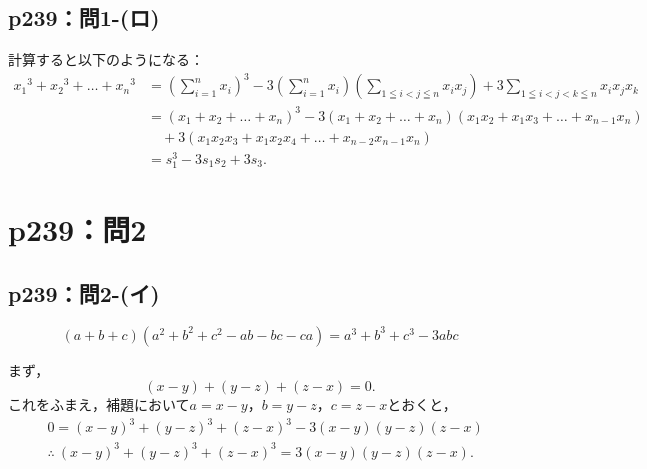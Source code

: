 \documentclass[a4paper,10pt,fleqn]{ltjsarticle}
\begin{document}
\subsection*{p239：問1-(ロ)}
\begin{tleftbar}
  計算すると以下のようになる：
  \begin{align*}
    {x_1}^3 + {x_2}^3+\dots+{x_n}^3 & = \left (\sum_{i=1}^{n} x_i \right )^3 - 3\left (\sum_{i=1}^{n} x_i \right ) \left(\sum_{1 \leqq i <j \leqq n} x_i x_j \right) + 3\sum_{1\leqq i < j < k \leqq n} x_i x_j x_k \\
                                    & = (x_1+x_2+\dots+x_n)^3 -3 (x_1+x_2+\dots+x_n)(x_1 x_2 +x_1 x_3 + \dots + x_{n-1} x_n)                                                                                        \\
                                    & \quad  +3(x_1 x_2 x_3 + x_1 x_2 x_4 + \dots + x_{n-2} x_{n-1} x_n)                                                                                                            \\
                                    & = s_1^3 -3s_1 s_2 + 3s_3.
  \end{align*}
\end{tleftbar}

\section*{p239：問2}

\subsection*{p239：問2-(イ)}



\[
  (a+b+c)(a^2+b^2 +c^2 -ab - bc -ca) = a^3 + b^3 + c^3 -3abc
\]

\begin{tleftbar}
  まず，
  \[
    (x-y)+(y-z)+(z-x) =0.
  \]
  これをふまえ，補題において$a=x-y$，$b=y-z$，$c=z-x$とおくと，
  \begin{align*}
     & 0 = (x-y)^3 + (y-z)^3 + (z-x)^3 - 3(x-y)(y-z)(z-x)           \\
     & \therefore ~ (x-y)^3 + (y-z)^3 + (z-x)^3 = 3(x-y)(y-z)(z-x).
  \end{align*}
\end{tleftbar}
\end{document}
